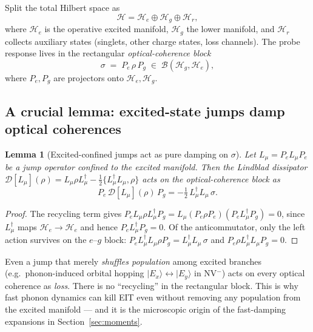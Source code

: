 \documentclass[11pt,a4paper]{article}
\newtheorem{lemma}[theorem]{Lemma}
\theoremstyle{remark}
\newcommand{\Hg}{\mathcal{H}_g}
\newcommand{\He}{\mathcal{H}_e}
\newcommand{\Hr}{\mathcal{H}_r}
\newcommand{\ket}[1]{|#1\rangle}
\begin{document}
Split the total Hilbert space as
\begin{equation}
\mathcal{H}=\He\oplus\Hg\oplus\Hr,
\end{equation}
where $\He$ is the operative excited manifold, $\Hg$ the lower manifold, and
$\Hr$ collects auxiliary states (singlets, other charge states, loss
channels). The probe response lives in the rectangular
\emph{optical-coherence block}
\begin{equation}
\sigma \;=\; P_e\,\rho\,P_g \;\in\; \mathcal{B}(\Hg,\He),
\end{equation}
where $P_{e},P_{g}$ are projectors onto $\He,\Hg$.

\subsection{A crucial lemma: excited-state jumps damp optical coherences}

\begin{lemma}[Excited-confined jumps act as pure damping on $\sigma$]
\label{lem:jump}
Let $L_\mu=P_e L_\mu P_e$ be a jump operator confined to the excited manifold.
Then the Lindblad dissipator
$\mathcal{D}[L_\mu](\rho)=L_\mu\rho L_\mu^\dagger
 -\tfrac12\{L_\mu^\dagger L_\mu,\rho\}$
acts on the optical-coherence block as
\begin{equation}
P_e\,\mathcal{D}[L_\mu](\rho)\,P_g
 = -\tfrac12\,L_\mu^\dagger L_\mu\,\sigma .
\end{equation}
\end{lemma}

\begin{proof}
The recycling term gives
$P_e L_\mu\rho L_\mu^\dagger P_g
 = L_\mu (P_e\rho P_e) (P_e L_\mu^\dagger P_g)=0$,
since $L_\mu^\dagger$ maps $\He\to\He$ and hence $P_e L_\mu^\dagger P_g=0$.
Of the anticommutator, only the left action survives on the $e$--$g$ block:
$P_e L_\mu^\dagger L_\mu \rho P_g=L_\mu^\dagger L_\mu\,\sigma$ and
$P_e\rho L_\mu^\dagger L_\mu P_g=0$. 
\end{proof}

\begin{physbox}
Even a jump that merely \emph{shuffles population} among excited branches
(e.g.\ phonon-induced orbital hopping $\ket{E_x}\leftrightarrow\ket{E_y}$ in
NV$^-$) acts on every optical coherence as \emph{loss}. There is no
``recycling'' in the rectangular block. This is why fast phonon dynamics can
kill EIT even without removing any population from the excited manifold ---
and it is the microscopic origin of the fast-damping expansions in
Section~\ref{sec:moments}.
\end{physbox}
\end{document}
